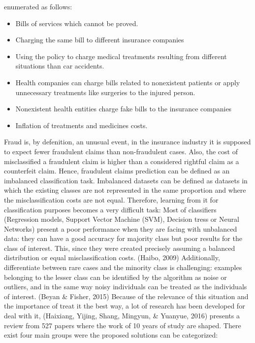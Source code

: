\documentclass[parskip=full]{scrartcl}
\begin{document}
enumerated as follows: 
\begin{itemize}
	\item Bills of services which cannot be proved.
	\item Charging the same bill to different insurance companies
	\item Using the policy to charge medical treatments resulting from 
	different situations than car accidents.
	\item Health companies can charge bills related to nonexistent patients or 
	apply unnecessary treatments like surgeries to the injured person.
	\item Nonexistent health entities charge fake bills to the insurance 
	companies
	\item Inflation of treatments and medicines costs.
\end{itemize}
Fraud is, by defenition, an unusual event, in the insurance industry it is 
supposed to expect fewer fraudulent claims than non-fraudulent cases. Also, the 
cost of misclassified a fraudulent claim is higher than a considered rightful 
claim as a counterfeit claim.  Hence, fraudulent claims prediction can be 
defined as an imbalanced classification task. 
Imbalanced datasets can be defined as datasets in which the existing classes 
are not represented in the same proportion and where the misclassification 
costs are not equal. Therefore, learning from it for classification purposes 
becomes a very difficult task: 
Most of classifiers (Regression models, Support Vector Machine (SVM), Decision 
tress or Neural Networks) present a poor performance when they are facing with 
unbalanced data: they can have a good accuracy for majority class but poor 
results for the class of interest.  This, since they were created precisely 
assuming a balanced distribution or equal misclassification costs. (Haibo, 
2009) 
Additionally, differentiate between rare cases and the minority class is 
challenging: examples belonging to the lesser class can be identified by the 
algorithm as noise or outliers, and in the same way noisy individuals can be 
treated as the individuals of interest. (Beyan & Fisher, 2015)
Because of the relevance of this situation and the importance of treat it the 
best way, a lot of research has been developed for deal with it, (Haixiang, 
Yijing, Shang, Mingyun, & Yuanyue, 2016) presents a review from 527 papers 
where the work of 10 years of study are shaped. 
There exist four main groups were the proposed solutions can be categorized: 





\end{document}
